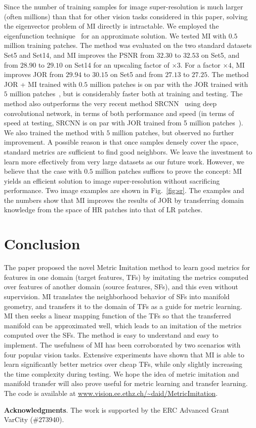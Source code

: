 \documentclass[10pt,twocolumn,letterpaper]{article}
\begin{document}
Since the number of training samples for image super-resolution is
much larger (often millions) than that for other vision tasks considered 
in this paper, solving the eigenvector problem of MI directly is 
intractable. We employed the eigenfunction technique~\cite{Fergus09} 
for an approximate solution.  We
tested MI with $0.5$ million training patches.  The method was
evaluated on the two standard datasets Set5 and Set14, and MI improves
the PSNR from $32.30$ to $32.53$ on Set5, and from $28.90$ to $29.10$
on Set14 for an upscaling factor of $\times 3$. For a factor $\times 4$,
MI improves JOR from $29.94$ to $30.15$ on Set5 and from $27.13$ to
$27.25$. The method JOR + MI trained with $0.5$ million patches is on
par with the JOR trained with $5$ million patches~\cite{JOR:EG15}, but
is considerably faster both at training and testing.  The method also
outperforms the very recent method SRCNN~\cite{Dong-ECCV-2014} using
deep convolutional network, in terms of both performance and speed (in
terms of speed at testing, SRCNN is on par with JOR trained from 5
million patches~\cite{JOR:EG15}). We also trained the
method with $5$ million patches, but observed no further improvement. 
A possible reason is that once samples densely cover
the space, standard metrics are sufficient to find good
neighbors. We leave the investment to learn more effectively from very large datasets as our future work. 
However, we believe that the case with $0.5$ million
patches suffices to prove the concept: MI yields an
efficient solution to image super-resolution without sacrificing 
performance. 
Two image examples are shown in Fig.~\ref{fig:sr}. The examples and
the numbers show that MI improves the results of JOR by
transferring domain knowledge from the space of HR patches into that
of LR patches. 


\section{Conclusion}
\label{sec:con}
The paper proposed the novel Metric Imitation method to
learn good metrics for features in one domain (target
features, TFs) by imitating the metrics computed over features of
another domain (source features, SFs), and this even without supervision. 
MI translates the neighborhood
behavior of SFs into manifold geometry, and transfers it to the domain
of TFs as a guide for metric learning. MI then seeks a linear mapping
function of the TFs so that the transferred manifold can be
approximated well, which leads to an imitation of the metrics computed
over the SFs. The method is easy to understand and easy to implement. The usefulness
of MI has been corroborated by two scenarios with four popular vision
tasks. Extensive experiments have shown that MI is able to learn 
significantly better metrics over cheap TFs, while only slightly
increasing the time complexity during testing. We hope the idea of metric
imitation and manifold transfer will also prove useful for metric
learning and transfer learning. The code is available at
  \url{www.vision.ee.ethz.ch/~daid/MetricImitation}.

\textbf{Acknowledgments}. The work is supported by the ERC Advanced
Grant VarCity (\#273940). 

  {
   }
\end{document}
